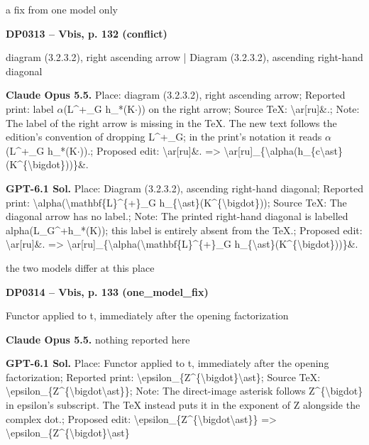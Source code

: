 a fix from one model only\par
\par\noindent\hypertarget{DP0313}{}\textbf{DP0313 -- Vbis, p. 132 (conflict)}\par
diagram (3.2.3.2), right ascending arrow | Diagram (3.2.3.2), ascending right-hand diagonal\par
\textbf{Claude Opus 5.5.} Place: diagram (3.2.3.2), right ascending arrow; Reported print: label \ensuremath{\alpha}(L\textasciicircum{}+\_G h\_*(K\ensuremath{\cdot})) on the right arrow; Source TeX: \textbackslash{}ar[ru]\&.; Note: The label of the right arrow is missing in the TeX. The new text follows the edition's convention of dropping L\textasciicircum{}+\_G; in the print's notation it reads \ensuremath{\alpha}(L\textasciicircum{}+\_G h\_*(K\ensuremath{\cdot})).; Proposed edit: \textbackslash{}ar[ru]\&. =\allowbreak > \textbackslash{}ar[ru]\_\{\textbackslash{}alpha(h\_\{c\textbackslash{}ast\}(K\textasciicircum{}\{\textbackslash{}bigdot\}))\}\&.\par
\textbf{GPT-6.1 Sol.} Place: Diagram (3.2.3.2), ascending right-hand diagonal; Reported print: \textbackslash{}alpha(\textbackslash{}mathbf\{L\}\textasciicircum{}\{+\}\_G h\_\{\textbackslash{}ast\}(K\textasciicircum{}\{\textbackslash{}bigdot\})); Source TeX: The diagonal arrow has no label.; Note: The printed right-hand diagonal is labelled alpha(L\_G\textasciicircum{}+h\_*(K)); this label is entirely absent from the TeX.; Proposed edit: \textbackslash{}ar[ru]\&. =\allowbreak > \textbackslash{}ar[ru]\_\{\textbackslash{}alpha(\textbackslash{}mathbf\{L\}\textasciicircum{}\{+\}\_G h\_\{\textbackslash{}ast\}(K\textasciicircum{}\{\textbackslash{}bigdot\}))\}\&.\par
the two models differ at this place\par
\par\noindent\hypertarget{DP0314}{}\textbf{DP0314 -- Vbis, p. 133 (one\_model\_fix)}\par
Functor applied to t, immediately after the opening factorization\par
\textbf{Claude Opus 5.5.} nothing reported here\par
\textbf{GPT-6.1 Sol.} Place: Functor applied to t, immediately after the opening factorization; Reported print: \textbackslash{}epsilon\_\{Z\textasciicircum{}\{\textbackslash{}bigdot\}\textbackslash{}ast\}; Source TeX: \textbackslash{}epsilon\_\{Z\textasciicircum{}\{\textbackslash{}bigdot\textbackslash{}ast\}\}; Note: The direct-image asterisk follows Z\textasciicircum{}\{\textbackslash{}bigdot\} in epsilon's subscript. The TeX instead puts it in the exponent of Z alongside the complex dot.; Proposed edit: \textbackslash{}epsilon\_\{Z\textasciicircum{}\{\textbackslash{}bigdot\textbackslash{}ast\}\} =\allowbreak > \textbackslash{}epsilon\_\{Z\textasciicircum{}\{\textbackslash{}bigdot\}\textbackslash{}ast\}\par
